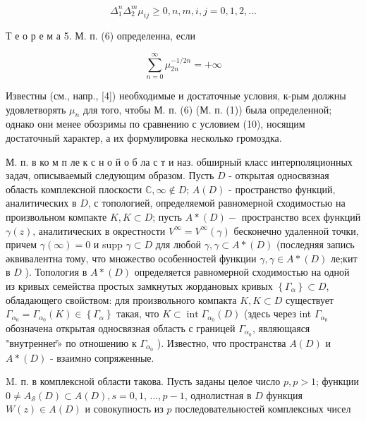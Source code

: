 \documentclass[10pt]{article}
\begin{document}
\[

\Delta_{1}^{n} \Delta_{2}^{m} \mu_{i j} \geqslant 0, n, m, i, j=0,1,2, \ldots

\]



Т е о р е м а 5. М. п. (6) определенна, если



\[

\sum_{n=0}^{\infty} \mu_{2 n}^{-1 / 2 n}=+\infty

\]



Известны (см., напр., [4]) необходимые и достаточные условия, к-рым должны удовлетворять $\mu_{n}$ для того, чтобы М. п. (6) (М. п. (1)) была определенной; однако они менее обозримы по сравнению с условием (10), носящим достаточный характер, а их формулировка несколько громоздка.



М. п. в ко м п ле к с н о й о б ла с т и наз. обширный класс интерполяционных задач, описываемый следующим образом. Пусть $D$ - открытая односвязная область комплексной плоскости $\mathbb{C}, \infty \notin D$; $A(D)$ - пространство функций, аналитических в $D$, с топологией, определяемой равномерной сходимостью на произвольном компакте $K, K \subset D$; пусть $A *(D)-$ пространство всех функций $\gamma(z)$, аналитических в окрестности $V^{\infty}=V^{\infty}(\gamma)$ бесконечно удаленной точки, причем $\gamma(\infty)=0$ и supp $\gamma \subset D$ для любоӥ $\gamma, \gamma \subset A *(D)$ (последняя запись әквивалентна тому, что множество особенностей функции $\gamma, \gamma \in A *(D)$ ле;кит в $D$ ). Топология в $A *(D)$ определяется равномерной сходимостью на одной из кривых семейства простых замкнутых жордановых кривых $\left\{\Gamma_{\alpha}\right\} \subset D$, обладающего свойством: для произвольного компакта $K, K \subset D$ существует $\Gamma_{\alpha_{0}}=\Gamma_{\alpha_{0}}(K) \in\left\{\Gamma_{\alpha}\right\}$ такая, что $K \subset \operatorname{int} \Gamma_{\alpha_{0}}(D)$ (здесь через int $\Gamma_{\alpha_{0}}$ обозначена открытая односвязная область с границей $\Gamma_{\alpha_{0}}$, являющаяся "внутреннег̆» по отношению к $\Gamma_{\alpha_{0}}$ ). Известно, что пространства $A(D)$ и $A *(D)$ - взаимно сопряженные.



M. п. в комплексной области такова. Пусть заданы целое число $p, p>1$; функции $0 \neq A_{\mathcal{S}}(D) \subset A(D), s=0,1$, $\ldots, p-1$, однолистная в $D$ функция $W(z) \in A(D)$ и совокупность из $p$ последовательностей комплексных чисел
\end{document}
